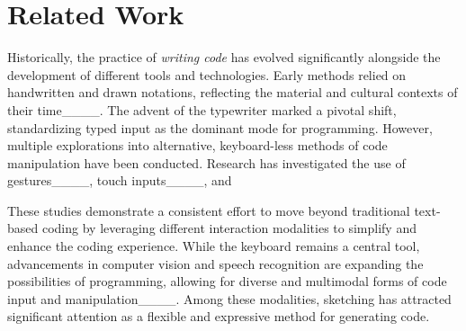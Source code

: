 \section{Related Work}
Historically, the practice of \textit{writing code} has evolved significantly alongside the development of different tools and technologies. Early methods relied on handwritten and drawn notations, reflecting the material and cultural contexts of their time____. 
The advent of the typewriter marked a pivotal shift, standardizing typed input as the dominant mode for programming.
However, multiple explorations into alternative, keyboard-less methods of code manipulation have been conducted. Research has investigated the use of gestures____, touch inputs____, and 




These studies demonstrate a consistent effort to move beyond traditional text-based coding by leveraging different interaction modalities to simplify and enhance the coding experience.
While the keyboard remains a central tool, advancements in computer vision and speech recognition are expanding the possibilities of programming, allowing for diverse and multimodal forms of code input and manipulation____.
Among these modalities, sketching has attracted significant attention as a flexible and expressive method for generating code.


